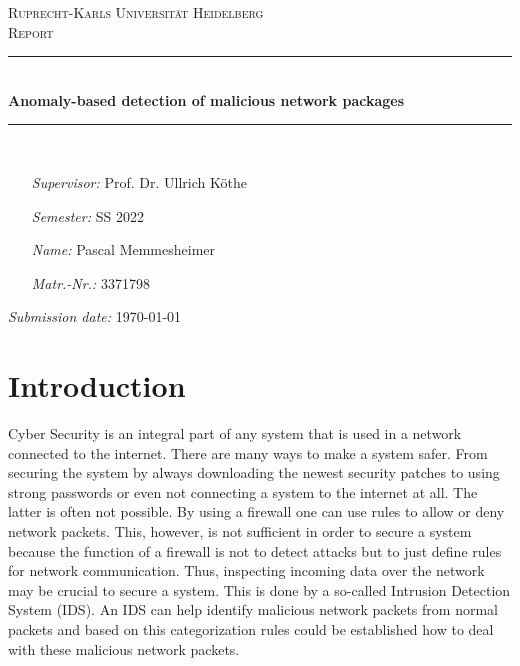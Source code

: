 \documentclass[]{article}
\begin{document}
	
	\begin{titlepage}
		\thispagestyle{empty}
		\newcommand{\HRule}{\rule{\linewidth}{0.5mm}}
		\hspace{1cm}
		\center
		
		\textsc{\huge Ruprecht-Karls Universität Heidelberg}\\[2.0cm]
		
		\textsc{\Large Report}\\[1.0cm]
		
		\HRule\\[1.4cm]
		
		{ \huge \bfseries Anomaly-based detection of malicious network packages}\\[0.8cm]
		\HRule \\[8.4cm]
		
		
		\begin{minipage}[t]{0.8\textwidth}
			\begin{itemize}
				\item[\emph{Supervisor:}] Prof. Dr. Ullrich Köthe
				\item[\emph{Semester:}] SS 2022
				\item[\emph{Name:}] Pascal Memmesheimer
				\item[\emph{Matr.-Nr.:}] 3371798
			\end{itemize}
		\end{minipage}
		
		\vspace{2.5cm}
		
		\flushright \emph{Submission date:} \today
	\end{titlepage}
	\restoregeometry
	
	\tableofcontents
	
	\newpage

	\section{Introduction}

	Cyber Security is an integral part of any system that is used in a network connected to the internet. There are many ways to make a system safer. From securing the system by always downloading the newest security patches to using strong passwords or even not connecting a system to the internet at all. The latter is often not possible. By using a firewall one can use rules to allow or deny network packets. This, however, is not sufficient in order to secure a system because the function of a firewall is not to detect attacks but to just define rules for network communication. Thus, inspecting incoming data over the network may be crucial to secure a system. This is done by a so-called Intrusion Detection System (IDS). An IDS can help identify malicious network packets from normal packets and based on this categorization rules could be established how to deal with these malicious network packets. 
	\newline
	
\end{document}
